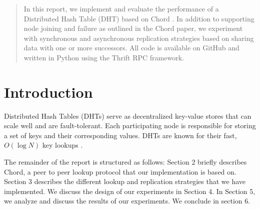 \documentclass{sig-alternate-10pt}
\begin{document}
\maketitle
\begin{abstract}
In this report, we implement and evaluate the performance of a Distributed Hash Table (DHT) based on Chord \cite{chord}. In addition to supporting node joining and failure as outlined in the Chord paper, we experiment with synchronous and asynchronous replication strategies based on sharing data with one or more successors.  All code is available on GitHub \cite{github} and written in Python using the Thrift RPC \cite{thrift} framework.
\end{abstract}




\section{Introduction}
Distributed Hash Tables (DHTs) serve as decentralized key-value stores that can scale well and are fault-tolerant. Each participating node is responsible for storing a set of keys and their corresponding values. DHTs are known for their fast, $O(\log N)$ key lookups \cite{chord}.

The remainder of the report is structured as follows: Section 2 briefly describes Chord, a peer to peer lookup protocol that our implementation is based on. Section 3 describes the different lookup and replication strategies that we have implemented. We discuss the design of our experiments in Section 4. In Section 5, we analyze and discuss the results of our experiments. We conclude in section 6.
\end{document}

